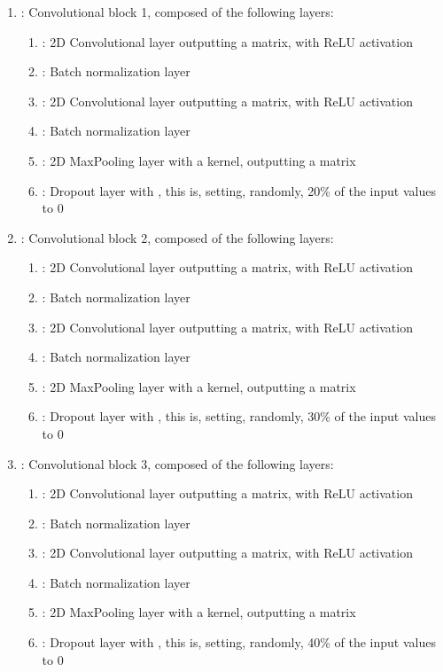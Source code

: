 \documentclass[conference]{IEEEtran}
\begin{document}
\begin{enumerate}
    \item : Convolutional block 1, composed of the following layers:
    \begin{enumerate}
        \item : 2D Convolutional layer outputting a  matrix, with ReLU activation
        \item : Batch normalization layer
        \item : 2D Convolutional layer outputting a  matrix, with ReLU activation
        \item : Batch normalization layer
        \item : 2D MaxPooling layer with a  kernel, outputting a  matrix
        \item : Dropout layer with , this is, setting, randomly, 20\% of the input values to 0
    \end{enumerate}
    
    \item : Convolutional block 2, composed of the following layers:
    \begin{enumerate}
        \item : 2D Convolutional layer outputting a  matrix, with ReLU activation
        \item : Batch normalization layer
        \item : 2D Convolutional layer outputting a  matrix, with ReLU activation
        \item : Batch normalization layer
        \item : 2D MaxPooling layer with a  kernel, outputting a  matrix
        \item : Dropout layer with , this is, setting, randomly, 30\% of the input values to 0
    \end{enumerate}
    
    \item : Convolutional block 3, composed of the following layers:
    \begin{enumerate}
        \item : 2D Convolutional layer outputting a  matrix, with ReLU activation
        \item : Batch normalization layer
        \item : 2D Convolutional layer outputting a  matrix, with ReLU activation
        \item : Batch normalization layer
        \item : 2D MaxPooling layer with a  kernel, outputting a  matrix
        \item : Dropout layer with , this is, setting, randomly, 40\% of the input values to 0
    \end{enumerate}
    

\end{enumerate}
\end{document}
